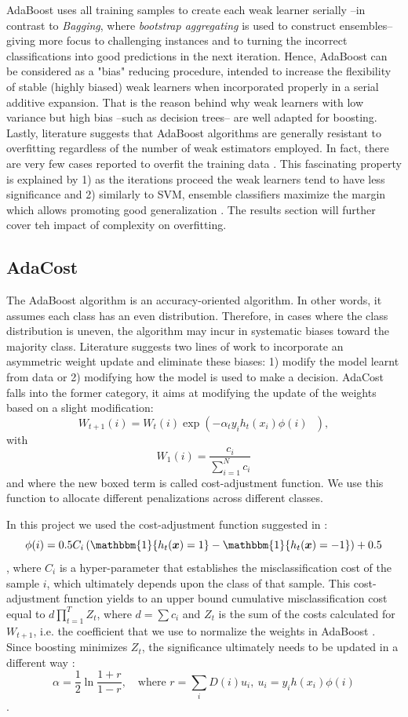\documentclass[conference]{IEEEtran}
\begin{document}
AdaBoost uses all training samples to create each weak learner serially --in contrast to \textit{Bagging}, where \textit{bootstrap aggregating} is used to construct ensembles-- giving more focus to challenging instances and to turning the incorrect classifications into good predictions in the next iteration. Hence, AdaBoost can be considered as a "bias" reducing procedure, intended to increase the flexibility of stable (highly biased) weak learners when incorporated properly in a serial additive expansion. That is the reason behind why weak learners with low variance but high bias --such as decision trees-- are well adapted for boosting. Lastly, literature suggests that AdaBoost algorithms are generally resistant to overfitting regardless of the number of weak estimators employed. In fact, there are very few cases reported to overfit the training data \cite{BoostingStats}. This fascinating property is explained by 1) as the iterations proceed the weak learners tend to have less significance and 2) similarly to SVM, ensemble classifiers maximize the margin which allows promoting good generalization \cite{margin_adaboost}. The results section will further cover teh impact of complexity on overfitting.

\subsection{AdaCost}
The AdaBoost algorithm is an accuracy-oriented algorithm. In other words, it assumes each class has an even distribution. Therefore, in cases where the class distribution is uneven, the algorithm may incur in systematic biases toward the majority class. Literature suggests two lines of work to incorporate an asymmetric weight update and eliminate these biases: \cite{need_boosting} 1) modify the model learnt from data or 2) modifying how the model is used to make a decision. AdaCost falls into the former category, it aims at modifying the update of the weights based on a slight modification:
$$ W_{t+1}(i) = W_t(i) \exp \left(-\alpha_t y_i h_t(x_i) \boxed{\phi(i)} \text{ } \right),$$
with $$ W_1(i) = \frac{c_i}{\sum_{i=1}^Nc_i}$$
and where the new boxed term is called cost-adjustment function. We use this function to allocate different penalizations across different classes. %

In this project we used the cost-adjustment function suggested in \cite{ensembles_review}:
$$\phi(i) = 0.5C_i \left( \mathbbm{1}\{ h_t(\boldsymbol x)=1\} -  \mathbbm{1}\{ h_t(\boldsymbol x)=-1\} \right)+0.5$$, where $C_i$ is a hyper-parameter that establishes the misclassification cost of the sample $i$, which ultimately depends upon the class of that sample. This cost-adjustment function yields to an upper bound cumulative misclassification cost equal to $d\prod_{t=1}^TZ_t$, where $d= \sum c_i$ and $Z_t$ is the sum of the costs calculated for $W_{t+1}$, i.e. the coefficient that we use to normalize the weights in AdaBoost \cite{adacost}. Since boosting minimizes $Z_t$, the significance ultimately needs to be updated in a different way \cite{improved_boosting}:
$$ \alpha = \frac{1}{2}\ln\frac{1+r}{1-r},\quad \text{where } r=\sum_iD(i)u_i, \  u_i=y_i h(x_i)\phi(i)$$.
\end{document}
